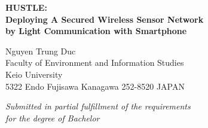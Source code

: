 \documentclass[12pt,a4j]{report}
\begin{document}
\thispagestyle{empty}
\parindent=1pt

\begin{center}

\vspace{30mm}
{\Large\bf HUSTLE:}\\ 
{\Large\bf Deploying A Secured Wireless Sensor Network}\\ 
{\Large\bf by Light Communication with Smartphone}\\
\vspace{3mm}

\vspace{10mm}

{\LARGE Nguyen Trung Duc}\\
\vspace{10mm}
{\Large Faculty of Environment and Information Studies}\\
\vspace{5mm}
{\LARGE Keio University}\\
\vspace{5mm}
{\Large 5322 Endo Fujisawa Kanagawa 252-8520}
{\Large JAPAN}\\
\vspace{10mm}

{\Large\it  Submitted in partial fulfillment of the requirements} \\
\vspace{3mm}
{\Large\it  for the degree of Bachelor}\\

\vspace{12mm}


\end{center}
\end{document}
